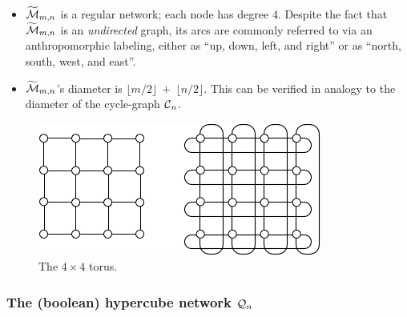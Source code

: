 \begin{itemize}
\begin{itemize}
  \item
$\widetilde{\mbox{$\cal M$}}_{m,n}$ is a regular network; each node has degree $4$.
    Despite the fact that $\widetilde{\mbox{$\cal M$}}_{m,n}$ is an {\em
      undirected} graph, its arcs are commonly referred to via an
    anthropomorphic labeling, either as ``up, down, left, and right''
    or as ``north, south, west, and east''.
  \item {}
$\widetilde{\mbox{$\cal M$}}_{m,n}$'s diameter is $\lfloor m/2 \rfloor \ + \
\lfloor n/2 \rfloor$.  This can be verified in analogy to the diameter
of the cycle-graph $\mbox{$\cal C$}_n$.
\end{itemize}
\end{itemize}

\begin{figure}[hbt]
\begin{center}
       \includegraphics[scale=0.6]{FiguresGraph/meshtorus}
       \caption{The $4 \times 4$ torus.}
  \label{fig:torus}
\end{center}
\end{figure}



\subsubsection{The (boolean) hypercube network $\mbox{$\cal Q$}_n$}
\label{sec:hypercube}

